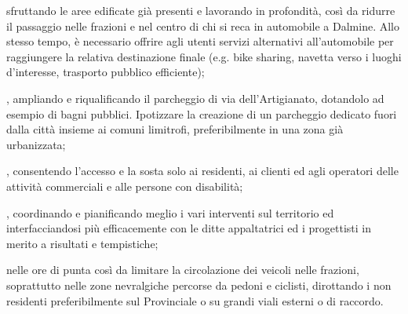  sfruttando le aree edificate già presenti e lavorando in profondità, così da ridurre il passaggio nelle frazioni e nel centro di chi si reca in automobile a Dalmine. Allo stesso tempo, è necessario offrire agli utenti servizi alternativi all'automobile per raggiungere la relativa destinazione finale (e.g. bike sharing, navetta verso i luoghi d'interesse, trasporto pubblico efficiente);

, ampliando e riqualificando il parcheggio di via dell'Artigianato, dotandolo ad esempio di bagni pubblici. Ipotizzare la creazione di un parcheggio dedicato fuori dalla città insieme ai comuni limitrofi, preferibilmente in una zona già urbanizzata; 

, consentendo l'accesso e la sosta solo ai residenti, ai clienti ed agli operatori delle attività commerciali e alle persone con disabilità;

, coordinando e pianificando meglio i vari interventi sul territorio ed interfacciandosi più efficacemente con le ditte appaltatrici ed i progettisti in merito a risultati e tempistiche;

\begin{bluebox}
 nelle ore di punta così da limitare la circolazione dei veicoli nelle frazioni, soprattutto nelle zone nevralgiche percorse da pedoni e ciclisti, dirottando i non residenti preferibilmente sul Provinciale o su grandi viali esterni o di raccordo.
\end{bluebox}
